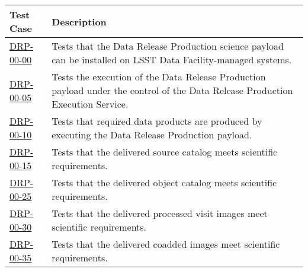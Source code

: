 \begin{longtable} {|p{}|p{}|}\hline
\textbf{Test Case}  & \textbf{Description} \\\hline

\hyperref[drp-00-00]{DRP-00-00} & Tests that the Data Release Production science payload can be installed on LSST Data Facility-managed systems.\\\hline
\hyperref[drp-00-05]{DRP-00-05} & Tests the execution of the Data Release Production payload under the control of the Data Release Production Execution Service.\\\hline
\hyperref[drp-00-10]{DRP-00-10} & Tests that required data products are produced by executing the Data Release Production payload. \\\hline
\hyperref[drp-00-15]{DRP-00-15} & Tests that the delivered source catalog meets scientific requirements. \\\hline
\hyperref[drp-00-25]{DRP-00-25} & Tests that the delivered object catalog meets scientific requirements. \\\hline
\hyperref[drp-00-30]{DRP-00-30} & Tests that the delivered processed visit images meet scientific requirements. \\\hline
\hyperref[drp-00-35]{DRP-00-35} & Tests that the delivered coadded images meet scientific requirements. \\\hline

\end{longtable}
